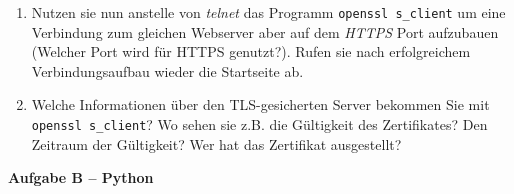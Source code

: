 \documentclass[paper=a4,fontsize=11pt]{scrartcl}%
\numberwithin{equation}{section}
\begin{document}
\begin{enumerate}
\begin{enumerate}
 		\item Nutzen sie nun anstelle von \emph{telnet} das Programm \texttt{openssl s\_client} um eine Verbindung zum gleichen Webserver aber auf dem \emph{HTTPS} Port aufzubauen (Welcher Port wird für HTTPS genutzt?). Rufen sie nach erfolgreichem Verbindungsaufbau wieder die Startseite ab.
 		\item Welche Informationen über den TLS-gesicherten Server bekommen Sie mit \texttt{openssl s\_client}? Wo sehen sie z.B. die Gültigkeit des Zertifikates? Den Zeitraum der Gültigkeit? Wer hat das Zertifikat ausgestellt?
	\end{enumerate}
\end{enumerate}

\begin{center}\Large{\textbf{Aufgabe B -- Python}}\end{center}\vskip0.25in
\end{document}
